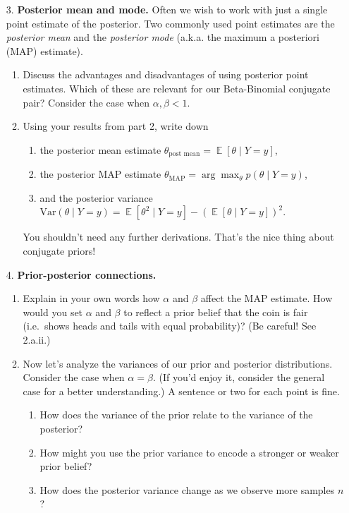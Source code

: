 \documentclass[submit]{harvardml}
\DeclareMathOperator*{\mean}{\mathbb{E}}
\begin{document}
\newpage
\begin{framed}
\begin{enumerate}
  \item[3.]
    \textbf{Posterior mean and mode.} Often we wish to work with just a
    single point estimate of the posterior. Two commonly used point
    estimates are the \emph{posterior mean} and the \emph{posterior mode}
    (a.k.a. the maximum a posteriori (MAP) estimate).
  
    \begin{enumerate}
    \item
      Discuss the advantages and disadvantages of using posterior point
      estimates. Which of these are relevant for our Beta-Binomial conjugate pair? Consider the case when $\alpha, \beta < 1$.
    
    \item
      Using your results from part 2, write down
      
      \begin{enumerate}
        \item the posterior mean estimate \(\theta_{\text{post mean}} = \mean [\theta \mid Y = y]\),
        \item the posterior MAP estimate \(\theta_{\text{MAP}}=\arg \max_{\theta}p(\theta \mid Y=y)\),
        \item and the posterior variance $\mathrm{Var}(\theta \mid Y = y) = \mean[\theta^2 \mid Y = y] - (\mean[\theta \mid Y = y])^2$.
      \end{enumerate}
      
      You shouldn't need any further derivations. That's the nice thing about conjugate priors!
      
    \end{enumerate}

\item[4.]
    \textbf{Prior-posterior connections.}

    \begin{enumerate}
    \item
      Explain in your own words how \(\alpha\) and \(\beta\) affect the
      MAP estimate. How would you set \(\alpha\) and \(\beta\) to reflect
      a prior belief that the coin is fair (i.e.~shows heads and tails
      with equal probability)? (Be careful! See 2.a.ii.)

    \item Now let's analyze the variances of our prior and posterior distributions. Consider the case when $\alpha = \beta$. (If you'd enjoy it, consider the general case for a better understanding.) A sentence or two for each point is fine.
    \begin{enumerate}
      \item How does the variance of the prior relate to the variance of the posterior?
      \item How might you use the prior variance to encode a stronger or weaker prior belief?
      \item How does the posterior variance change as we observe more samples $n$?
    \end{enumerate}
    \end{enumerate}


\end{enumerate}
\end{framed}
\end{document}
